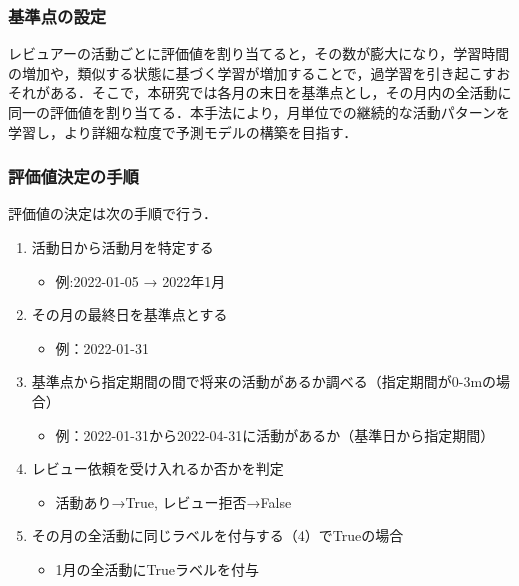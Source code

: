 \documentclass[submit,techrep,noauthor]{ipsj}
\begin{document}
\subsubsection{基準点の設定}
レビュアーの活動ごとに評価値を割り当てると，その数が膨大になり，学習時間の増加や，類似する状態に基づく学習が増加することで，過学習を引き起こすおそれがある．そこで，本研究では各月の末日を基準点とし，その月内の全活動に同一の評価値を割り当てる．本手法により，月単位での継続的な活動パターンを学習し，より詳細な粒度で予測モデルの構築を目指す．

\subsubsection{評価値決定の手順}
評価値の決定は次の手順で行う．
\begin{enumerate}
    \item 活動日から活動月を特定する
    \begin{itemize}
        \item 例:2022-01-05 → 2022年1月
    \end{itemize}
    \item その月の最終日を基準点とする
    \begin{itemize}
        \item 例：2022-01-31
    \end{itemize}
    \item 基準点から指定期間の間で将来の活動があるか調べる（指定期間が0-3mの場合）
    \begin{itemize}
        \item 例：2022-01-31から2022-04-31に活動があるか（基準日から指定期間）
    \end{itemize}
    \item レビュー依頼を受け入れるか否かを判定
    \begin{itemize}
        \item 活動あり→True, レビュー拒否→False
    \end{itemize}
        \item その月の全活動に同じラベルを付与する（4）でTrueの場合
    \begin{itemize}
        \item 1月の全活動にTrueラベルを付与
    \end{itemize}
\end{enumerate}

\end{document}
